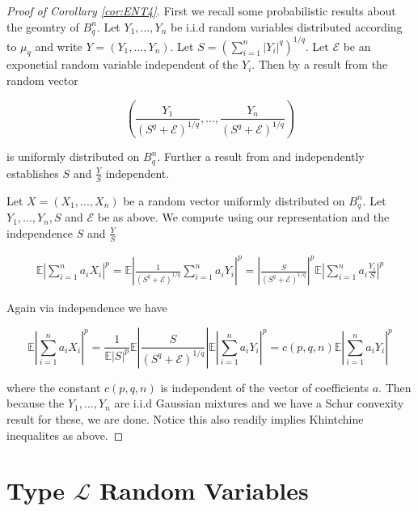 \documentclass[10pt]{article}
\newcommand{\E}{\mathbb{E}}
\newcommand{\1}{\textbf{1}}
\newcommand{\normOne}[1]{\left\lvert#1\right\rvert}
\theoremstyle{remark}
\theoremstyle{definition}
\begin{document}
\begin{proof}[Proof of Corollary \ref{cor:ENT4}]

First we recall some probabilistic results about the geomtry of $B_q^n$. Let $Y_1,...,Y_n$ be i.i.d random variables distributed according to $\mu_q$ and write $Y = (Y_1,...,Y_n)$. Let $S = (\sum_{i=1}^n|Y_i|^q)^{1/q}$. Let $\mathcal{E}$ be an exponetial random variable independent of the $Y_i$. Then by a result from \cite{BGMN} the random vector


\begin{equation*}
	(\frac{Y_1}{(S^q+\mathcal{E})^{1/q}},...,\frac{Y_n}{(S^q+\mathcal{E})^{1/q}})
\end{equation*}


is uniformly distributed on $B_q^n$. Further a result from \cite{RR} and independently \cite{SZ} establishes $S$ and $\frac{Y}{S}$ independent.


Let $X = (X_1,...,X_n)$ be a random vector uniformly distributed on $B^n_q$. Let $Y_1,...,Y_n,S$ and $\mathcal{E}$ be as above. We compute using our representation and the independence $S$ and $\frac{Y}{S}$

\begin{align*}
	\E\normOne{\sum_{i=1}^na_iX_i}^p = \E\normOne{\frac{1}{(S^q+\mathcal{E})^{1/q}}\sum_{i=1}^na_iY_i}^p = \normOne{\frac{S}{(S^q+\mathcal{E})^{1/q}}}^p \E\normOne{\sum_{i=1}^n a_i\frac{Y_i}{S}}^p 
\end{align*}

Again via independence we have

\begin{equation}
	\E\normOne{\sum_{i=1}^n a_iX_i}^p = \frac{1}{\E\normOne{S}^p} \E\normOne{\frac{S}{(S^q+\mathcal{E})^{1/q}}}\E\normOne{\sum_{i=1}^n a_iY_i}^p = c(p,q,n) \E\normOne{\sum_{i=1}^na_iY_i}^p
\end{equation}

where the constant $c(p,q,n)$ is independent of the vector of coefficients $a$. Then because the $Y_1,...,Y_n$ are i.i.d Gaussian mixtures and we have a Schur convexity result for these, we are done. Notice this also readily implies Khintchine inequalites as above.
\end{proof}


\newpage

\section{Type $\mathcal{L}$ Random Variables}
\end{document}
